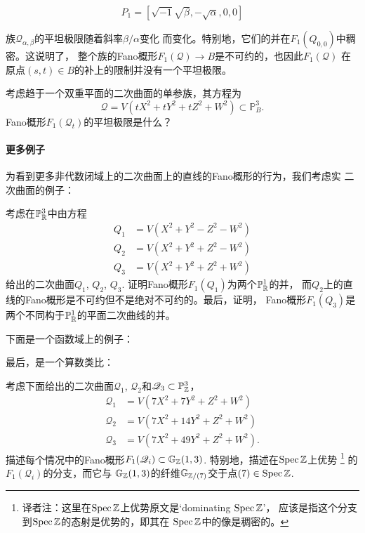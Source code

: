 
\nottran

\[
	P_{1}=[\sqrt{-1} \sqrt{\beta},-\sqrt{\alpha}, 0,0]
\]


族$\mathscr Q_{\alpha,\beta}$的平坦极限随着斜率$\beta/\alpha$变化
而变化。特别地，它们的并在$F_1(Q_{0,0})$中稠密。这说明了，
整个族的Fano概形$F_1(\mathscr Q)\to B$是不可约的，也因此$F_1(\mathscr Q)$
在原点$(s,t)\in B$的补上的限制并没有一个平坦极限。

\begin{exe}\label{exe:6.69}
考虑趋于一个双重平面的二次曲面的单参族，其方程为
\[
	\mathscr{Q}=V\left(t X^{2}+t Y^{2}+t Z^{2}+W^{2}\right) \subset \mathbb{P}_{B}^{3}.
\]
Fano概形$F_1(\mathscr Q_t)$的平坦极限是什么？
\end{exe}


\paragraph*{更多例子}
为看到更多非代数闭域上的二次曲面上的直线的Fano概形的行为，我们考虑实
二次曲面的例子：

\begin{exe}\label{exe:4.70}
考虑在$\P_{\mathbb R}^3$中由方程
\[
\begin{aligned} Q_{1} &=V\left(X^{2}+Y^{2}-Z^{2}-W^{2}\right) \\ Q_{2} &=V\left(X^{2}+Y^{2}+Z^{2}-W^{2}\right) \\ Q_{3} &=V\left(X^{2}+Y^{2}+Z^{2}+W^{2}\right) \end{aligned}
\]
给出的二次曲面$Q_1$, $Q_2$, $Q_3$. 证明Fano概形$F_1(Q_1)$为两个$\P_{\mathbb R}^1$的并，
而$Q_2$上的直线的Fano概形是不可约但不是绝对不可约的。最后，证明，
Fano概形$F_1(Q_3)$是两个不同构于$\P_{\mathbb R}^1$的平面二次曲线的并。
\end{exe}

下面是一个函数域上的例子：

\begin{exe}\label{exe:4.71}
\nottran
\end{exe}

最后，是一个算数类比：

\begin{exe}\label{exe:4.72}
考虑下面给出的二次曲面$\mathscr Q_1$, $\mathscr Q_2$和$\mathscr Q_3\subset \P_\zz^3$，
\[
\begin{aligned} \mathscr{Q}_{1} &=V\left(7 X^{2}+7 Y^{2}+Z^{2}+W^{2}\right) \\ \mathscr{Q}_{2} &=V\left(7 X^{2}+14 Y^{2}+Z^{2}+W^{2}\right) \\ \mathscr{Q}_{3} &=V\left(7 X^{2}+49 Y^{2}+Z^{2}+W^{2}\right).\end{aligned}
\]
描述每个情况中的Fano概形$F_1(\mathscr Q_i)\subset \mathbb G_\zz(1,3)$.
特别地，描述在$\spec \zz$上优势%
\footnote{
	译者注：这里在$\spec \zz$上优势原文是`dominating $\spec \zz$'，
	应该是指这个分支到$\spec \zz$的态射是优势的，即其在
	$\spec \zz$中的像是稠密的。
}%
的$F_1(\mathscr Q_i)$的分支，而它与
$\mathbb G_\zz(1,3)$的纤维$\mathbb G_{\zz/(7)}$交于点$(7)\in \spec \zz$.
\end{exe}

